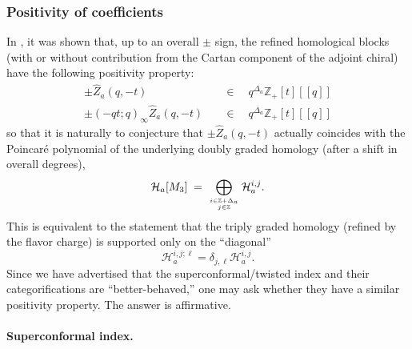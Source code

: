 \documentclass[hyper,letterpaper]{JHEP3}
\newcommand{\beq}{\begin{equation}\begin{aligned}}
\newcommand{\eeq}{\end{aligned}\end{equation}}
\newcommand{\Z}{{\mathbb Z}}
\renewcommand{\hat}{\widehat}
\def\CH{{\mathcal H}}
\begin{document}
\subsubsection{Positivity of coefficients}

In \cite{Gukov:2016gkn}, it was shown that, up to an overall $\pm$ sign,
the refined homological blocks (with or without contribution from the Cartan component of the adjoint chiral) have the following positivity property:
\beq\label{block-pos}
\pm \hat{Z}_a(q,-t) \quad & \in \quad q^{\Delta_a} \Z_+[t][[q]] \\
\pm (-qt;q)_\infty\hat{Z}_a(q,-t) \quad & \in \quad q^{\Delta_a} \Z_+[t][[q]]
\eeq
so that it is naturally to conjecture that $\pm \hat{Z}_a(q,-t)$ actually coincides with the Poincar\'e polynomial of the underlying doubly graded homology (after a shift in overall degrees),
\begin{equation}
\CH_a[M_3] \; = \; \bigoplus_{i\in \Z+\Delta_a\atop j\in \Z} \CH_a^{i,j}.
\end{equation}
This is equivalent to the statement that the triply graded homology (refined by the flavor charge) is supported only on the ``diagonal''
\begin{equation}
\CH_a^{i,j;\ell}=\delta_{j,\ell}\CH_a^{i,j}.
\end{equation}
Since we have advertised that the superconformal/twisted index and their categorifications are ``better-behaved,'' one may ask whether they have a similar positivity property. The answer is affirmative.

\paragraph{Superconformal index.}
\end{document}
